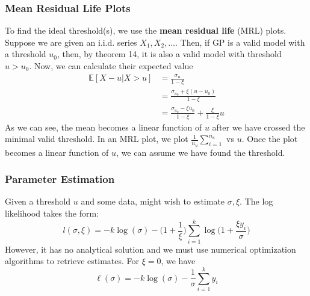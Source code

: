 \documentclass{article}
\theoremstyle{definition}
\theoremstyle{definition}
\def\E{\mathbb{E}}
\def\l{\ell}
\begin{document}
\subsubsection{Mean Residual Life Plots}
To find the ideal threshold(s), we use the \textbf{mean residual life} (MRL) plots. Suppose we are given an i.i.d. series $X_1, X_2, \hdots$. Then, if GP is a valid model with a threshold $u_0$, then, by theorem 14, it is also a valid model with threshold $u>u_0$. Now, we can calculate their expected value
\begin{align*}
    \E[X-u|X>u]&=\frac{\sigma_u}{1-\xi}\\&= \frac{\sigma_{u_0} +\xi(u-u_0)}{1-\xi}\\&= \frac{\sigma_{u_0} -\xi u_0}{1-\xi} + \frac{\xi}{1-\xi}u
\end{align*}
As we can see, the mean becomes a linear function of $u$ after we have crossed the minimal valid threshold. In an MRL plot, we plot $\frac{1}{n_u}\sum_{i=1}^{n_u}$ vs $u$. Once the plot becomes a linear function of $u$, we can assume we have found the threshold. 

\subsubsection{Parameter Estimation}
Given a threshold $u$ and some data,  might wish to estimate $\sigma, \xi$. The log likelihood takes the form:
\[l(\sigma,\xi)= -k\log(\sigma) - \bigg( 1+\frac{1}{\xi}\bigg)\sum_{i=1}^k\log\bigg( 1+\frac{\xi y_i}{\sigma}\bigg)\]
However, it has no analytical solution and we must use numerical optimization algorithms to retrieve estimates. For $\xi=0$, we have 
\[\l(\sigma)= -k\log(\sigma)- \frac{1}{\sigma}\sum_{i=1}^ky_i\]
\end{document}
